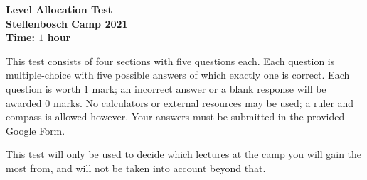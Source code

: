 \documentclass{article}
\begin{document}
\thispagestyle{empty}

\begin{center}
  \textbf{\Large Level Allocation Test}
  \\ \vspace{1em}
  \textbf{\large Stellenbosch Camp 2021}
  \\ \vspace{1em}
  \textbf{\large Time: $1$ hour}
\end{center}

\vspace{24pt}

This test consists of four sections with five questions each.
Each question is multiple-choice with five possible answers of which exactly one is correct.
Each question is worth $1$ mark; an incorrect answer or a blank response will be awarded $0$ marks.
No calculators or external resources may be used; a ruler and compass is allowed however.
Your answers must be submitted in the provided Google Form.

This test will only be used to decide which lectures at the camp you will gain the most from, and will not be taken into account beyond that.
\end{document}
